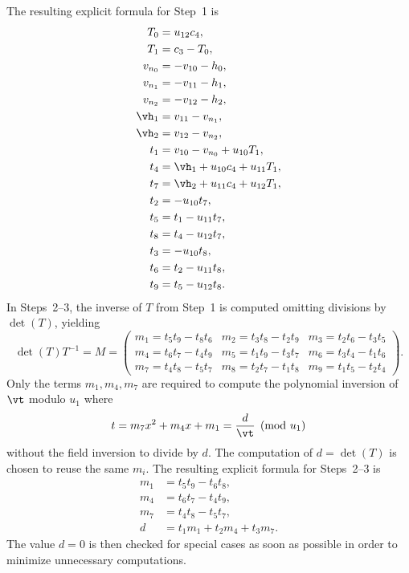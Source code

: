 The resulting explicit formula for Step~1 is
\begin{align*}
    T_0  &= u_{12}c_4,\\
    T_1  &= c_3 - T_0,\\
    v_{n_0} &= -v_{10} - h_0,\\
    v_{n_1} &= -v_{11} - h_1,\\    
    v_{n_2} &= -v_{12} - h_2,\\
    \vh_1 &= v_{11} - v_{n_1},\\
    \vh_2 &= v_{12} - v_{n_2},\\
    t_1 &= v_{10} - v_{n_0} + u_{10}T_1,\\
    t_4 &= \vh_1 + u_{10}c_4 + u_{11}T_1,\\
    t_7 &= \vh_2 + u_{11}c_4 + u_{12}T_1,\\
    t_2 &= -u_{10}t_7,\\
    t_5 &= t_1 - u_{11}t_7,\\
    t_8 &= t_4 - u_{12}t_7,\\
    t_3 &= -u_{10}t_8,\\
    t_6 &= t_2 - u_{11}t_8,\\
    t_9 &= t_5 - u_{12}t_8.
\end{align*}
In Steps~2--3, the inverse of $T$ from Step~1 is computed omitting divisions by $\det(T)$, yielding
$$ \det(T)T^{-1} = M = \left( \begin{array}{ccc}
m_1 = t_5t_9 - t_8t_6 & m_2 = t_3t_8 - t_2t_9 & m_3 = t_2t_6 - t_3t_5  \\
m_4 = t_6t_7 - t_4t_9 & m_5 = t_1t_9 - t_3t_7 & m_6 = t_3t_4 - t_1t_6  \\
m_7 = t_4t_8 - t_5t_7 & m_8 = t_2t_7 - t_1t_8 & m_9 = t_1t_5 - t_2t_4
\end{array} \right).$$ 
Only the terms $m_1,m_4,m_7$ are required to compute the polynomial inversion of
$\vt$ modulo $u_1$ where $$ t = m_7x^2 + m_4x + m_1 = \frac{d}{\vt}
\pmod{u_1}$$ without the field inversion to divide by $d$. The computation of $d = \det(T)$ is
chosen to reuse the same $m_i$. The resulting explicit formula for Steps~2--3 is
\begin{align*}
    m_1 &= t_5t_9 - t_6t_8,\\
    m_4 &= t_6t_7 - t_4t_9,\\
    m_7 &= t_4t_8 - t_5t_7,\\
    d   &= t_1m_1 + t_2m_4 + t_3m_7. 
\end{align*} 
The value $d = 0$ is then checked for special cases as soon as possible in order
to minimize unnecessary computations. 

